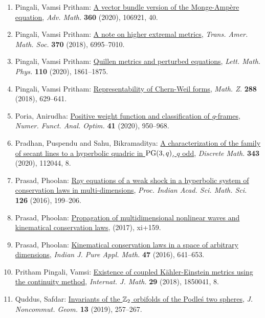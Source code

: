 \begin{enumerate}
\item Pingali, Vamsi Pritham: \href{https://doi.org/10.1016/j.aim.2019.106921}{A vector bundle version of the {M}onge-{A}mp\`ere equation}, \emph{Adv. Math.} {\bf 360} (2020), 106921, 40.
\item Pingali, Vamsi Pritham: \href{https://doi.org/10.1090/tran/7416}{A note on higher extremal metrics}, \emph{Trans. Amer. Math. Soc.} {\bf 370} (2018), 6995--7010.
\item Pingali, Vamsi Pritham: \href{https://doi.org/10.1007/s11005-020-01279-9}{Quillen metrics and perturbed equations}, \emph{Lett. Math. Phys.} {\bf 110} (2020), 1861--1875.
\item Pingali, Vamsi Pritham: \href{https://doi.org/10.1007/s00209-017-1903-2}{Representability of {C}hern-{W}eil forms}, \emph{Math. Z.} {\bf 288} (2018), 629--641.
\item Poria, Anirudha: \href{https://doi.org/10.1080/01630563.2020.1728771}{Positive weight function and classification of {$g$}-frames}, \emph{Numer. Funct. Anal. Optim.} {\bf 41} (2020), 950--968.
\item Pradhan, Puspendu and Sahu, Bikramaditya: \href{https://doi.org/10.1016/j.disc.2020.112044}{A characterization of the family of secant lines to a
hyperbolic quadric in {${\rm PG} (3,q)$}, {$q$} odd}, \emph{Discrete Math.} {\bf 343} (2020), 112044, 8.
\item Prasad, Phoolan: \href{https://doi.org/10.1007/s12044-016-0275-6}{Ray equations of a weak shock in a hyperbolic system of
conservation laws in multi-dimensions}, \emph{Proc. Indian Acad. Sci. Math. Sci.} {\bf 126} (2016), 199--206.
\item Prasad, Phoolan: \href{https://doi.org/10.1007/978-981-10-7581-0}{Propagation of multidimensional nonlinear waves and
kinematical conservation laws}, \emph{} {\bf } (2017), xi+159.
\item Prasad, Phoolan: \href{https://doi.org/10.1007/s13226-016-0197-0}{Kinematical conservation laws in a space of arbitrary
dimensions}, \emph{Indian J. Pure Appl. Math.} {\bf 47} (2016), 641--653.
\item Pritham Pingali, Vamsi: \href{https://doi.org/10.1142/S0129167X18500416}{Existence of coupled {K}\"{a}hler-{E}instein metrics using the
continuity method}, \emph{Internat. J. Math.} {\bf 29} (2018), 1850041, 8.
\item Quddus, Safdar: \href{https://doi.org/10.4171/JNCG/320}{Invariants of the {$\Bbb Z_2$} orbifolds of the {P}odle\'{s} two
spheres}, \emph{J. Noncommut. Geom.} {\bf 13} (2019), 257--267.

\end{enumerate}
